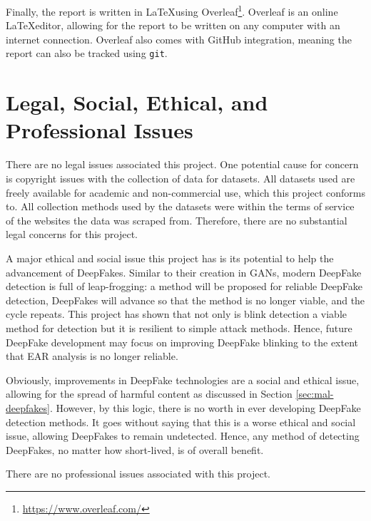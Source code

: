 Finally, the report is written in \LaTeX using Overleaf\footnote{\url{https://www.overleaf.com/}}. Overleaf is an online \LaTeX editor, allowing for the report to be written on any computer with an internet connection. Overleaf also comes with GitHub integration, meaning the report can also be tracked using \verb|git|.

\section{Legal, Social, Ethical, and Professional Issues}


There are no legal issues associated this project. One potential cause for concern is copyright issues with the collection of data for datasets. All datasets used are freely available for academic and non-commercial use, which this project conforms to. All collection methods used by the datasets were within the terms of service of the websites the data was scraped from. Therefore, there are no substantial legal concerns for this project.

A major ethical and social issue this project has is its potential to help the advancement of DeepFakes. Similar to their creation in GANs, modern DeepFake detection is full of leap-frogging: a method will be proposed for reliable DeepFake detection, DeepFakes will advance so that the method is no longer viable, and the cycle repeats. This project has shown that not only is blink detection a viable method for detection but it is resilient to simple attack methods. Hence, future DeepFake development may focus on improving DeepFake blinking to the extent that EAR analysis is no longer reliable. 

Obviously, improvements in DeepFake technologies are a social and ethical issue, allowing for the spread of harmful content as discussed in Section \ref{sec:mal-deepfakes}. However, by this logic, there is no worth in ever developing DeepFake detection methods. It goes without saying that this is a worse ethical and social issue, allowing DeepFakes to remain undetected. Hence, any method of detecting DeepFakes, no matter how short-lived, is of overall benefit.

There are no professional issues associated with this project.